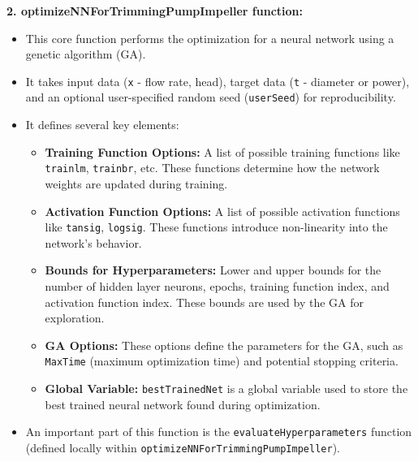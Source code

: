 \documentclass[
  super,
  review,
  3p]{elsarticle}
\providecommand{\tightlist}{%
  \setlength{\itemsep}{0pt}\setlength{\parskip}{0pt}}\usepackage{longtable,booktabs,array}
\begin{document}
\textbf{2. optimizeNNForTrimmingPumpImpeller function:}

\begin{itemize}
\tightlist
\item
  This core function performs the optimization for a neural network
  using a genetic algorithm (GA).
\item
  It takes input data (\texttt{x} - flow rate, head), target data
  (\texttt{t} - diameter or power), and an optional user-specified
  random seed (\texttt{userSeed}) for reproducibility.
\item
  It defines several key elements:

  \begin{itemize}
  \tightlist
  \item
    \textbf{Training Function Options:} A list of possible training
    functions like \texttt{\textquotesingle{}trainlm\textquotesingle{}},
    \texttt{\textquotesingle{}trainbr\textquotesingle{}}, etc. These
    functions determine how the network weights are updated during
    training.
  \item
    \textbf{Activation Function Options:} A list of possible activation
    functions like \texttt{\textquotesingle{}tansig\textquotesingle{}},
    \texttt{\textquotesingle{}logsig\textquotesingle{}}. These functions
    introduce non-linearity into the network's behavior.
  \item
    \textbf{Bounds for Hyperparameters:} Lower and upper bounds for the
    number of hidden layer neurons, epochs, training function index, and
    activation function index. These bounds are used by the GA for
    exploration.
  \item
    \textbf{GA Options:} These options define the parameters for the GA,
    such as \texttt{MaxTime} (maximum optimization time) and potential
    stopping criteria.
  \item
    \textbf{Global Variable:} \texttt{bestTrainedNet} is a global
    variable used to store the best trained neural network found during
    optimization.
  \end{itemize}
\item
  An important part of this function is the
  \texttt{evaluateHyperparameters} function (defined locally within
  \texttt{optimizeNNForTrimmingPumpImpeller}).


\end{itemize}
\end{document}
